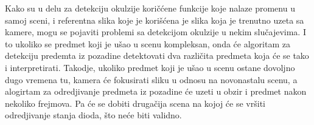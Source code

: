 \documentclass[a4paper,12pt, projekat]{etf}
\begin{document}
        Kako su u delu za detekciju okulzije kori\v{c}\'{c}ene funkcije koje
        nalaze promenu u samoj sceni, i referentna slika koje je
        kori\v{s}\'{c}ena je slika koja je trenutno uzeta sa kamere, mogu se
        pojaviti problemi sa detekcijom okulzije u nekim slu\v{c}ajevima. I to
        ukoliko se predmet koji je u\v{s}ao u scenu kompleksan, onda \'{c}e
        algoritam za detekciju predemta iz pozadine detektovati dva
        razli\v{c}ita predmeta koja \'{c}e se tako i interpretirati. Takodje,
        ukoliko predmet koji je u\v{s}ao u scenu ostane dovoljno dugo vremena
        tu, kamera \'{c}e fokusirati sliku u odnosu na novonastalu scenu, a
        alogirtam za odredjivanje predmeta iz pozadine \'{c}e uzeti u obzir i
        predmet nakon nekoliko frejmova. Pa \'{c}e se dobiti druga\v{c}ija
        scena na kojoj \'{c}e se vr\v{s}iti odredjivanje stanja dioda, \v{s}to
        ne\'{c}e biti validno.
\end{document}

